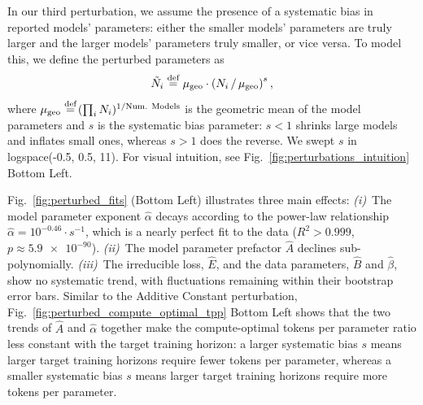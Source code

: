 In our third perturbation, we assume the presence of a systematic bias in reported models' parameters: either the smaller models' parameters are truly larger and the larger models' parameters truly smaller, or vice versa.
To model this, we define the perturbed parameters as
%
\begin{equation}\label{eqn:systematic_bias}
    \tilde{N}_i \operatorname{\stackrel{\text{def}}{\;=\;}} \mu_{\mathrm{geo}} \cdot \left( N_i \, / \, \mu_{\mathrm{geo}} \right)^{s},
\end{equation}
%
where \(\mu_{\mathrm{geo}} \operatorname{\stackrel{\text{def}}{\;=\;}} (\prod_i N_i)^{1/\text{Num. Models}}\) is the geometric mean of the model parameters and \(s\) is the systematic bias parameter: \(s < 1\) shrinks large models and inflates small ones, whereas \(s > 1\) does the reverse.
We swept $s$ in logspace(-0.5, 0.5, 11). For visual intuition, see Fig.~\ref{fig:perturbations_intuition} Bottom Left.

Fig.~\ref{fig:perturbed_fits} (Bottom Left) illustrates three main effects:
\emph{(i)}~The model parameter exponent $\hat{\alpha}$ decays according to the power-law relationship $\hat{\alpha} = 10^{-0.46} \cdot s^{-1}$, which is a nearly perfect fit to the data ($R^2 > 0.999$, $p \approx \num{5.9e-90}$).
\emph{(ii)}~The model parameter prefactor $\hat{A}$ declines sub-polynomially.
\emph{(iii)}~The irreducible loss, $\hat{E}$, and the data parameters, $\hat{B}$ and $\hat{\beta}$, show no systematic trend, with fluctuations remaining within their bootstrap error bars.
Similar to the Additive Constant perturbation, Fig.~\ref{fig:perturbed_compute_optimal_tpp} Bottom Left shows that the two trends of $\hat{A}$ and $\hat{\alpha}$ together make the compute-optimal tokens per parameter ratio less constant with the target training horizon: a larger systematic bias $s$ means larger target training horizons require fewer tokens per parameter, whereas a smaller systematic bias $s$  means larger target training horizons require more tokens per parameter.

